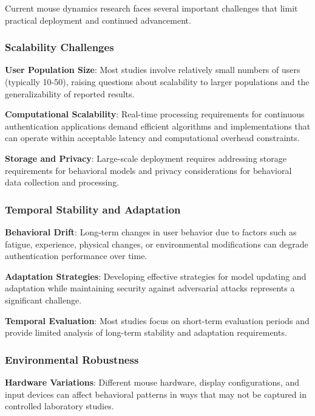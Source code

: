 \documentclass[
  12pt,
  a4paper,
]{report}
\begin{document}
Current mouse dynamics research faces several important challenges that
limit practical deployment and continued advancement.

\subsubsection{Scalability Challenges}\label{scalability-challenges}

\textbf{User Population Size}: Most studies involve relatively small
numbers of users (typically 10-50), raising questions about scalability
to larger populations and the generalizability of reported results.

\textbf{Computational Scalability}: Real-time processing requirements
for continuous authentication applications demand efficient algorithms
and implementations that can operate within acceptable latency and
computational overhead constraints.

\textbf{Storage and Privacy}: Large-scale deployment requires addressing
storage requirements for behavioral models and privacy considerations
for behavioral data collection and processing.

\subsubsection{Temporal Stability and
Adaptation}\label{temporal-stability-and-adaptation}

\textbf{Behavioral Drift}: Long-term changes in user behavior due to
factors such as fatigue, experience, physical changes, or environmental
modifications can degrade authentication performance over time.

\textbf{Adaptation Strategies}: Developing effective strategies for
model updating and adaptation while maintaining security against
adversarial attacks represents a significant challenge.

\textbf{Temporal Evaluation}: Most studies focus on short-term
evaluation periods and provide limited analysis of long-term stability
and adaptation requirements.

\subsubsection{Environmental Robustness}\label{environmental-robustness}

\textbf{Hardware Variations}: Different mouse hardware, display
configurations, and input devices can affect behavioral patterns in ways
that may not be captured in controlled laboratory studies.
\end{document}
